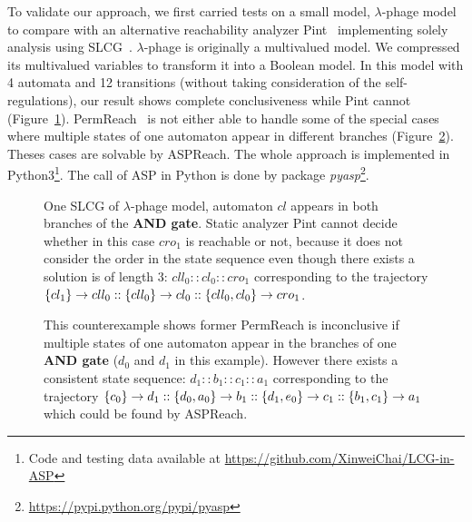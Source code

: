 To validate our approach, we first carried tests on a small model, $\lambda$-phage model~\cite{thieffry1995dynamical} to compare with an alternative reachability analyzer Pint~\cite{pauleve2012} implementing solely analysis using SLCG~\cite{pauleve2017reduction,folschette2015,pauleve2011}.
$\lambda$-phage is originally a multivalued model.
We compressed its multivalued variables to transform it into a Boolean model.
In this model with 4 automata and 12 transitions (without taking consideration of the self-regulations),
our result shows complete conclusiveness while Pint cannot (Figure~\ref{fig:LCG_lambdaPhage}). %
PermReach~\cite{chai2018heuristic} is not either able to handle some of the special cases where multiple states of one automaton appear in different branches (Figure~\ref{fig:countexPerm}).
Theses cases are solvable by ASPReach.
The whole approach is implemented in Python3\footnote{Code and testing data available at \url{https://github.com/XinweiChai/LCG-in-ASP}}.
The call of ASP in Python is done by package \textit{pyasp}\footnote{\url{https://pypi.python.org/pypi/pyasp}}. 

\begin{figure}[ht]
\centering
    
    \caption[SLCG of $\lambda$-phage model]{One SLCG of $\lambda$-phage model, automaton $cl$ appears in both branches of the \textbf{AND gate}. Static analyzer Pint cannot decide whether in this case $cro_1$ is reachable or not, because it does not consider the order in the state sequence even though there exists a solution is of length 3: $cll_0::cl_0::cro_1$ corresponding to the trajectory $\acm{cl_1}{cll_1}{cll_0}::\acm{cll_0}{cl_1}{cl_0}::\acm{cll_0,cl_0}{cro_0}{cro_1}$.}
    \label{fig:LCG_lambdaPhage}
\end{figure}
\begin{figure}[ht]
    \centering
    
    \caption[Counterexample of PermReach]{This counterexample shows former PermReach is inconclusive if multiple states of one automaton appear in the branches of one \textbf{AND gate} ($d_0$ and $d_1$ in this example). 
    However there exists a consistent state sequence: $d_1::b_1::c_1::a_1$ corresponding to the trajectory $\acm{c_0}{d_0}{d_1}::\acm{d_0,a_0}{b_0}{b_1}::\acm{d_1,e_0}{c_0}{c_1}::\acm{b_1,c_1}{a_0}{a_1}$ which could be found by ASPReach.}\label{fig:countexPerm}
\end{figure}


